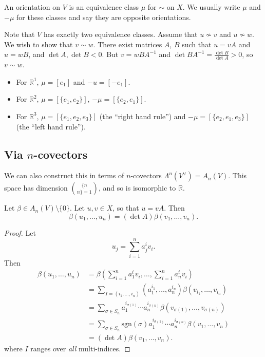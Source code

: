 \begin{defn}
An orientation on $V$ is an equivalence class $\mu$ for $\sim$ on $X$.
We usually write $\mu$ and $-\mu$ for these classes and say they are
opposite orientations.
\end{defn}

Note that $V$ has exactly two equivalence classes. Assume that
$u \nsim v$ and $u \nsim w$. We wish to show that $v \sim w$.
There exist matrices $A$, $B$ such that $u = vA$ and $u = w B$, and
$\det A, \det B < 0$. But $v = w BA^{-1}$ and
$\det BA^{-1} = \frac{\det B}{\det A} > 0$, so $v \sim w$.

\begin{xmpl}
\begin{itemize}
  \item{
    For $\mathbb{R}^1$, $\mu = [e_1]$ and $-u = [-e_1]$.
  }
  \item{
    For $\mathbb{R}^2$, $\mu = [\{e_1, e_2\}]$,
    $-\mu = [\{e_2, e_1\}]$.
  }
  \item{
    For $\mathbb{R}^3$, $\mu = [\{e_1, e_2, e_3\}]$
    (the ``right hand rule'') and
    $-\mu = [\{e_2, e_1, e_3\}]$ (the ``left hand rule'').
  }
\end{itemize}
\end{xmpl}

\subsection{Via $n$-covectors}
We can also construct this in terms of $n$-covectors
$\Lambda^n(V^\vee) = A_n(V)$. This space has dimension
$\{ n \choose n \} = 1$, and so is isomorphic to $\mathbb{R}$.

\begin{lemma}
Let $\beta \in A_n(V) \setminus \{ 0 \}$. Let
$u, v \in X$, so that $u = vA$. Then
$$
  \beta(u_1, \dots, u_n)
= (\det A)\beta(v_1, \dots, v_n).
$$
\end{lemma}
\begin{proof}
Let
$$
  u_j
= \sum_{i=1}^n
    a^i_j v_i.
$$
Then
\begin{align*}
   \beta(u_1, \dots, u_n)
&= \beta
     \left(
       \sum_{i=1}^n
         a_1^i v_i,
       \dots,
       \sum_{i=1}^n
         a_n^i v_i
     \right) \\
&= \sum_{I = (i_1, \dots, i_n)}
     (a_1^{i_1}, \dots, a_n^{i_n})
     \beta(v_{i_1}, \dots, v_{i_n}) \\
&= \sum_{\sigma \in S_n}
     a_1^{i_{\sigma(1)}}
     \cdots
     a_n^{i_{\sigma(n)}}
     \beta(
       v_{\sigma(1)}, \dots, v_{\sigma(n)}
     ) \\
&= \sum_{\sigma \in S_n}
     \mathrm{sgn}(\sigma)
       a_1^{i_{\sigma(1)}}
       \cdots
       a_n^{i_{\sigma(n)}}
       \beta(v_1, \dots, v_n) \\
&= (\det A)
   \beta(v_1, \dots, v_n).
\end{align*}
where $I$ ranges over \emph{all} multi-indices.
\end{proof}

